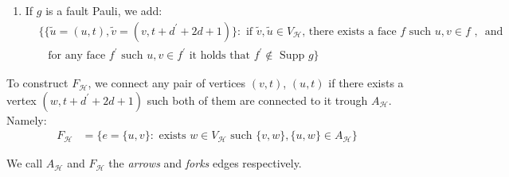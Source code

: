 \begin{definition}
\begin{enumerate}
\begin{enumerate}
    \item If $g$ is a fault Pauli, we add:
            \begin{equation*}
              \begin{split}
                & \bigl\{  \{  \tilde{u} = (u,t), \tilde{v} = (v,t+d^{\prime}+2d+1)\} : \text{ if } \tilde{v},\tilde{u} \in V_{\mathcal{H}}  \text{, there exists a face } f \text{ such }  u,v \in f \text{ , }  \text{ and }  \\ 
                &  \, \, \, \text { for any face  } f^{\prime} \text{ such }  u,v \in f^{\prime} \text{ it holds that  } f^{\prime} \notin  \text{ Supp } g  \bigr\} 
              \end{split}
            \end{equation*}
        \end{enumerate}
        To construct $F_{\mathcal{H}}$, we connect any pair of vertices $(v,t)$, $(u,t)$ if there exists a vertex $(w,t+d^{\prime}+2d + 1)$ such both of them are connected to it trough $A_{\mathcal{H}}$. Namely: 
        \begin{equation*}
          \begin{split}
            F_{\mathcal{H}} &= \big\{ e = \{u,v\} : \text{ exists } w \in V_{\mathcal{H}} \text{ such } \{v,w\},\{u,w\} \in A_{\mathcal{H}} \big\} 
          \end{split}
        \end{equation*}
    \end{enumerate}
    We call $A_{\mathcal{H}}$ and $F_{\mathcal{H}}$ the \textit{arrows} and \textit{forks} edges respectively. 
\end{definition}



